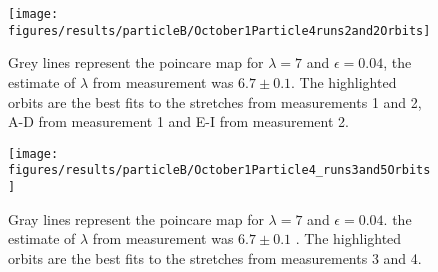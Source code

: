 \begin{figure}[H]
\centering
\texttt{[image: figures/results/particleB/October1Particle4runs2and2Orbits]}
\caption{Grey lines represent the poincare map for $\lambda = 7$ and $\epsilon=0.04$, the estimate of $\lambda$ from measurement was $6.7 \pm 0.1$. The highlighted orbits are the best fits to the stretches from measurements 1 and 2, A-D from measurement 1 and E-I from measurement 2.}
\label{fig:October1Particle4runs2and2Orbits}
\end{figure}


\begin{figure}[H]
\centering
\texttt{[image: figures/results/particleB/October1Particle4\_runs3and5Orbits]}
\caption{Gray lines represent the poincare map for $\lambda = 7$ and $\epsilon = 0.04$. the estimate of $\lambda$ from measurement was $6.7 \pm 0.1$ . The highlighted orbits are the best fits to the stretches from measurements 3 and 4.}
\label{fig:October1Particle4_runs3and5Orbits}
\end{figure}


